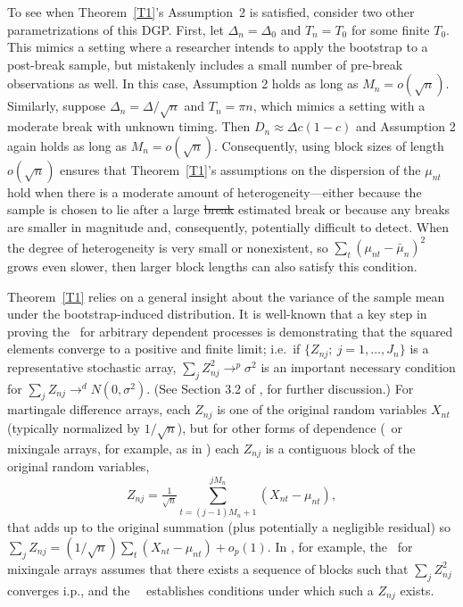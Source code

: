 \documentclass[11pt]{article}
\providecommand{\DIFadd}[1]{{\protect\color{blue}\uwave{#1}}} %
\providecommand{\DIFdel}[1]{{\protect\color{red}\sout{#1}}}                      %
\providecommand{\DIFaddbegin}{} %
\providecommand{\DIFaddend}{} %
\providecommand{\DIFdelbegin}{} %
\providecommand{\DIFdelend}{} %
\begin{document}
To see when Theorem~\ref{T1}'s Assumption~2 is satisfied, consider two
other parametrizations of this DGP\@. First, let $\Delta_n = \Delta_0$
and $T_n = T_0$ for some finite $T_0$. This mimics a setting where a
researcher intends to apply the bootstrap to a post-break sample, but
mistakenly includes a small number of pre-break observations as
well. In this case, Assumption 2 holds as long as
$M_n = o(\sqrt{n})$.  Similarly, suppose
$\Delta_n = \Delta / \sqrt{n}$ and $T_n = \pi n$, which mimics a
setting with a moderate break with unknown timing.  Then
$D_n \approx \Delta$\DIFdelbegin\DIFdel{$c (1 - c)$}\DIFdelend%
\DIFaddbegin\DIFadd{$\pi (1 - \pi)$}\DIFaddend
and Assumption 2 again holds as long as
$M_n = o(\sqrt{n})$. Consequently, using block sizes of length
$o(\sqrt{n})$ ensures that Theorem~\ref{T1}'s assumptions on the dispersion
of the $\mu_{nt}$ hold when there is a moderate amount of
heterogeneity---either because the sample is chosen to lie after a
large \DIFdelbegin \DIFdel{break }\DIFdelend estimated break or because any breaks are smaller in
magnitude and, consequently, potentially difficult to detect. When the
degree of heterogeneity is very small or nonexistent, so
$\sum_t (\mu_{nt} - \bar \mu_n)^2$ grows even slower, then larger
block lengths can also satisfy this condition.

Theorem~\ref{T1} relies on a general insight about the
variance of the sample mean under the bootstrap-induced
distribution. It is well-known that a key step in proving the \clt\
for arbitrary dependent processes is demonstrating that the squared
elements converge to a positive and finite limit; i.e.\ if
$\{Z_{nj};~j=1,\dots,J_n\}$ is a representative stochastic array,
$\sum_j Z_{nj}^2 \to^p \sigma^2$ is an important necessary condition
for $\sum_j Z_{nj} \to^d N(0,\sigma^2)$.  (See Section 3.2 of
\citealp{HaH:80}, for further discussion.)  For martingale difference
arrays, each $Z_{nj}$ is one of the original random variables $X_{nt}$
(typically normalized by $1/\sqrt{n}$), but for other forms of
dependence (\ned\ or mixingale arrays, for example, as in
\citealp{Jon:97}) each $Z_{nj}$ is a contiguous block of the original
random variables,
\begin{equation*}
  Z_{nj} = \tfrac{1}{\sqrt{n}} \sum_{t=(j-1) M_n +1}^{j M_n} (X_{nt} - \mu_{nt}),
\end{equation*}
that adds up to the original summation (plus potentially a negligible
residual) so $\sum_j Z_{nj}= (1/\sqrt{n}) \sum_t (X_{nt} - \mu_{nt}) +
o_p(1)$. In \citet{Jon:97}, for example, the \clt\ for mixingale
arrays assumes that there exists a sequence of blocks such that $\sum_j
Z_{nj}^2$ converges i.p., and the \ned\ \clt\ establishes conditions
under which such a $Z_{nj}$ exists.
\end{document}
